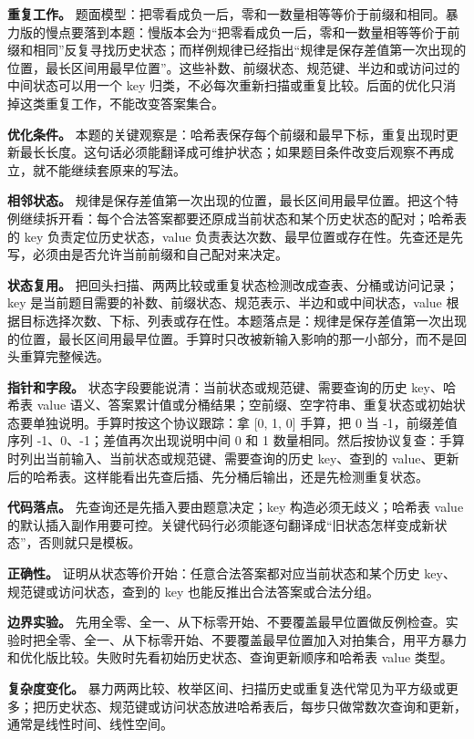 \textbf{重复工作。} 题面模型：把零看成负一后，零和一数量相等等价于前缀和相同。暴力版的慢点要落到本题：慢版本会为“把零看成负一后，零和一数量相等等价于前缀和相同”反复寻找历史状态；而样例规律已经指出“规律是保存差值第一次出现的位置，最长区间用最早位置”。这些补数、前缀状态、规范键、半边和或访问过的中间状态可以用一个 key 归类，不必每次重新扫描或重复比较。后面的优化只消掉这类重复工作，不能改变答案集合。

\textbf{优化条件。} 本题的关键观察是：哈希表保存每个前缀和最早下标，重复出现时更新最长长度。这句话必须能翻译成可维护状态；如果题目条件改变后观察不再成立，就不能继续套原来的写法。

\textbf{相邻状态。} 规律是保存差值第一次出现的位置，最长区间用最早位置。把这个特例继续拆开看：每个合法答案都要还原成当前状态和某个历史状态的配对；哈希表的 key 负责定位历史状态，value 负责表达次数、最早位置或存在性。先查还是先写，必须由是否允许当前前缀和自己配对来决定。

\textbf{状态复用。} 把回头扫描、两两比较或重复状态检测改成查表、分桶或访问记录；key 是当前题目需要的补数、前缀状态、规范表示、半边和或中间状态，value 根据目标选择次数、下标、列表或存在性。本题落点是：规律是保存差值第一次出现的位置，最长区间用最早位置。手算时只改被新输入影响的那一小部分，而不是回头重算完整候选。

\textbf{指针和字段。} 状态字段要能说清：当前状态或规范键、需要查询的历史 key、哈希表 value 语义、答案累计值或分桶结果；空前缀、空字符串、重复状态或初始状态要单独说明。手算时按这个协议跟踪：拿 [0, 1, 0] 手算，把 0 当 -1，前缀差值序列 -1、0、-1；差值再次出现说明中间 0 和 1 数量相同。然后按协议复查：手算时列出当前输入、当前状态或规范键、需要查询的历史 key、查到的 value、更新后的哈希表。这样能看出先查后插、先分桶后输出，还是先检测重复状态。

\textbf{代码落点。} 先查询还是先插入要由题意决定；key 构造必须无歧义；哈希表 value 的默认插入副作用要可控。关键代码行必须能逐句翻译成“旧状态怎样变成新状态”，否则就只是模板。

\textbf{正确性。} 证明从状态等价开始：任意合法答案都对应当前状态和某个历史 key、规范键或访问状态，查到的 key 也能反推出合法答案或合法分组。

\textbf{边界实验。} 先用全零、全一、从下标零开始、不要覆盖最早位置做反例检查。实验时把全零、全一、从下标零开始、不要覆盖最早位置加入对拍集合，用平方暴力和优化版比较。失败时先看初始历史状态、查询更新顺序和哈希表 value 类型。

\textbf{复杂度变化。} 暴力两两比较、枚举区间、扫描历史或重复迭代常见为平方级或更多；把历史状态、规范键或访问状态放进哈希表后，每步只做常数次查询和更新，通常是线性时间、线性空间。

